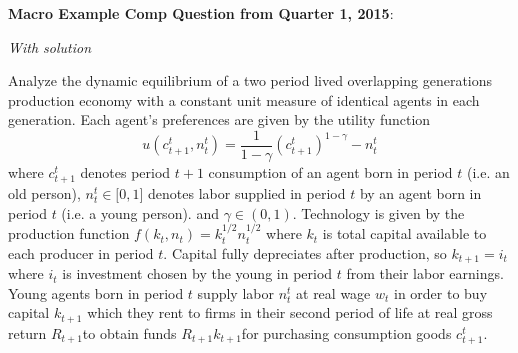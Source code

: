 \documentclass{article}
\begin{document}
\textbf{Macro Example Comp Question from Quarter 1, 2015}:

\textit{With solution}

\bigskip

Analyze the dynamic equilibrium of a two period lived overlapping
generations production economy with a constant unit measure of identical
agents in each generation. Each agent's preferences are given by the utility
function 
\[
u(c_{t+1}^{t},n_{t}^{t})=\frac{1}{1-\gamma }(c_{t+1}^{t})^{1-\gamma
}-n_{t}^{t} 
\]%
where $c_{t+1}^{t}$ denotes period $t+1$ consumption of an agent born in
period $t$ (i.e. an old person), $n_{t}^{t}\in \lbrack 0,1]$ denotes labor
supplied in period $t$ by an agent born in period $t$ (i.e. a young person).
and $\gamma \in (0,1)$. Technology is given by the production function $%
f(k_{t},n_{t})=k_{t}^{1/2}n_{t}^{1/2}$ where $k_{t}$ is total capital
available to each producer in period $t.$ Capital fully depreciates after
production, so $k_{t+1}=i_{t}$ where $i_{t}$ is investment chosen by the
young in period $t$ from their labor earnings. Young agents born in period $%
t $ supply labor $n_{t}^{t}$ at real wage $w_{t}$ in order to buy capital $%
k_{t+1}$ which they rent to firms in their second period of life at real
gross return $R_{t+1}$to obtain funds $R_{t+1}k_{t+1}$for purchasing
consumption goods $c_{t+1}^{t}$.
\end{document}
